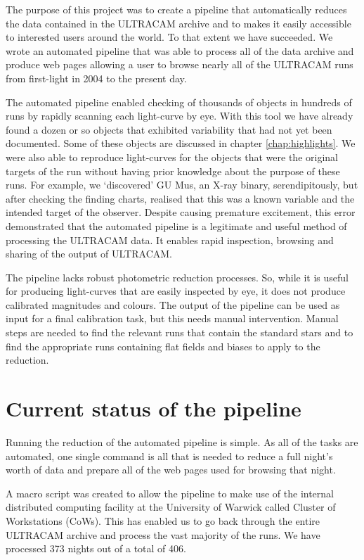 The purpose of this project was to create a pipeline that automatically reduces the data contained in the ULTRACAM archive and to makes it easily accessible to interested users around the world. To that extent we have succeeded. We wrote an automated pipeline that was able to process all of the data archive and produce web pages allowing a user to browse nearly all of the ULTRACAM runs from first-light in 2004 to the present day. 

The automated pipeline enabled checking of thousands of objects in hundreds of runs by rapidly scanning each light-curve by eye. With this tool  we have already found a dozen or so objects that exhibited variability that had not yet been documented. Some of these objects are discussed in chapter \ref{chap:highlights}. We were also able to reproduce light-curves for the objects that were the original targets of the run without having prior knowledge about the purpose of these runs. For example, we `discovered' {GU Mus}, an X-ray binary, serendipitously, but after checking the finding charts, realised that this was a known variable and the intended target of the observer. Despite causing premature excitement, this error demonstrated that the automated pipeline is a legitimate and useful method of processing the ULTRACAM data. It enables rapid inspection, browsing and sharing of the output of ULTRACAM. 

The pipeline lacks robust photometric reduction processes. So, while it is useful for producing light-curves that are easily inspected by eye, it does not produce calibrated magnitudes and colours. The output of the pipeline can be used as input for a final calibration task, but this needs manual intervention. Manual steps are needed to find the relevant runs that contain the standard stars and to find the appropriate runs containing flat fields and biases to apply to the reduction. 

\section{Current status of the pipeline}
Running the reduction of the automated pipeline is simple. As all of the tasks are automated, one single command is all that is needed to reduce a full night's worth of data and prepare all of the web pages used for browsing that night. 

A macro script was created to allow the pipeline to make use of the internal distributed computing facility at the University of Warwick called Cluster of Workstations (CoWs). This has enabled us to go back through the entire ULTRACAM archive and process the vast majority of the runs. We have processed 373 nights out of a total of 406. 

